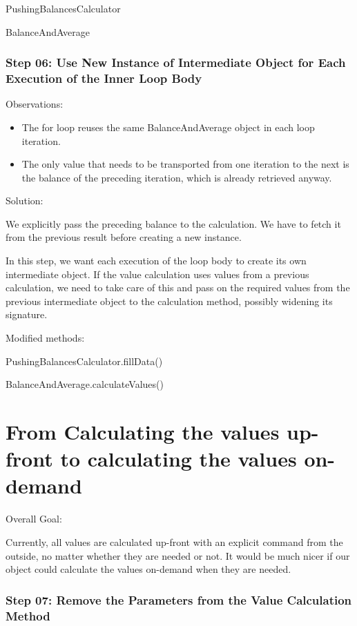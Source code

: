 \documentclass[a4paper,fleqn,titlepage,11pt]{article}
\begin{document}
PushingBalancesCalculator

BalanceAndAverage


\section*{Step 06: Use New Instance of Intermediate Object for Each Execution of the Inner Loop Body}

Observations:
\begin{itemize}
\item The for loop reuses the same BalanceAndAverage object in each loop iteration.
\item The only value that needs to be transported from one iteration to the next is the balance of the preceding iteration, which is already retrieved anyway.
\end{itemize}

Solution:

We explicitly pass the preceding balance to the calculation. We have to fetch it from the previous result before creating a new instance.

In this step, we want each execution of the loop body to create its own intermediate object. If the value calculation uses values from a previous calculation, we need to take care of this and pass on the required values from the previous intermediate object to the calculation method, possibly widening its signature.

Modified methods:

PushingBalancesCalculator.fillData()

BalanceAndAverage.calculateValues()

\part{From Calculating the values up-front to calculating the values on-demand}

Overall Goal:

Currently, all values are calculated up-front with an explicit command from the outside, no matter whether they are needed or not. It would be much nicer if our object could calculate the values on-demand when they are needed.


\section*{Step 07: Remove the Parameters from the Value Calculation Method}
\end{document}
